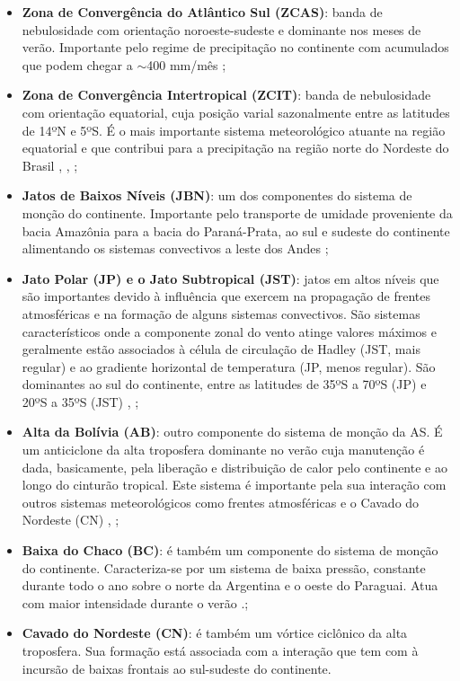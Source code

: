\begin{itemize}
\item \textbf{Zona de Convergência do Atlântico Sul (ZCAS)}: banda de nebulosidade com orientação noroeste-sudeste e dominante nos meses de verão. Importante pelo regime de precipitação no continente com acumulados que podem chegar a $\sim$400 mm/mês \cite{kodama92};
\item \textbf{Zona de Convergência Intertropical (ZCIT)}: banda de nebulosidade com orientação equatorial, cuja posição varial sazonalmente entre as latitudes de 14ºN e 5ºS. É o mais importante sistema meteorológico a\-tu\-an\-te na região equatorial e que contribui para a precipitação na região norte do Nordeste do Brasil \cite{hastenrathheller77}, \cite{uvonobre89a}, \cite{uvonobre89b};
\item \textbf{Jatos de Baixos Níveis (JBN)}: um dos componentes do sistema de monção do continente. Importante pelo transporte de umidade proveniente da bacia Amazônia para a bacia do Paraná-Prata, ao sul e sudeste do continente alimentando os sistemas convectivos a leste dos Andes \cite{bonner68};
\item \textbf{Jato Polar (JP) e o Jato Subtropical (JST)}: jatos em altos níveis que são importantes devido à influência que exercem na propagação de frentes atmosféricas e na formação de alguns sistemas convectivos. São sistemas característicos onde a componente zonal do vento atinge valores máximos e geralmente estão associados à célula de circulação de Hadley (JST, mais regular) e ao gradiente horizontal de temperatura (JP, menos regular). São dominantes ao sul do continente, entre as latitudes de 35ºS a 70ºS (JP) e  20ºS a 35ºS (JST) \cite{reiter69}, \cite{riehl69};
\item \textbf{Alta da Bolívia (AB)}: outro componente do sistema de monção da AS. É um anticiclone da alta troposfera dominante no verão cuja manutenção é dada, basicamente, pela liberação e distribuição de calor pelo continente e ao longo do cinturão tropical. Este sistema é importante pela sua interação com outros sistemas meteorológicos como frentes atmosféricas e o Cavado do Nordeste (CN) \cite{carvalho89}, \cite{oliveira86};
\item \textbf{Baixa do Chaco (BC)}: é também um componente do sistema de monção do continente. Caracteriza-se por um sistema de baixa pressão, constante durante todo o ano sobre o norte da Argentina e o oeste do Paraguai. Atua com maior intensidade durante o verão \cite{grimmetal04}.;
\item \textbf{Cavado do Nordeste (CN)}: é também um vórtice ciclônico da alta troposfera. Sua formação está associada com a interação que tem com à incursão de baixas frontais ao sul-sudeste do continente.
\end{itemize}

